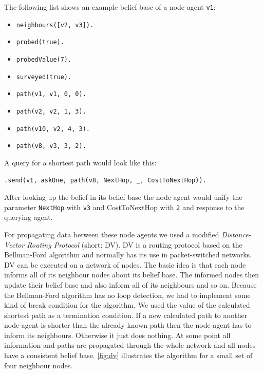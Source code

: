 \begin{samepage}
The following list shows an example belief base of a node agent \texttt{v1}:
\begin{itemize}
  \item \texttt{neighbours([v2, v3]).}
  \item \texttt{probed(true).}
  \item \texttt{probedValue(7).}
  \item \texttt{surveyed(true).}
  \item \texttt{path(v1, v1, 0, 0).}
  \item \texttt{path(v2, v2, 1, 3).}
  \item \texttt{path(v10, v2, 4, 3).}
  \item \texttt{path(v8, v3, 3, 2).}
\end{itemize}
\end{samepage}

A query for a shortest path would look like this:
\begin{lstlisting}[caption={Query for shortest path from \texttt{v1} to \texttt{v8}}, label={lst:dv_shortestPath_query}]
  .send(v1, askOne, path(v8, NextHop, _, CostToNextHop)).
\end{lstlisting}
After looking up the belief in its belief base the node agent would unify the parameter \texttt{NextHop} with \texttt{v3} and CostToNextHop with \texttt{2} and response to the querying agent.

For propagating data between these node agents we used a modified \emph{Distance-Vector Routing Protocol} (short: DV).
DV is a routing protocol based on the Bellman-Ford algorithm and normally has its use in packet-switched networks.
DV can be executed on a network of nodes.
The basic idea is that each node informs all of its neighbour nodes about its belief base.
The informed nodes then update their belief base and also inform all of its neighbours and so on.
Because the Bellman-Ford algorithm has no loop detection, we had to implement some kind of break condition for the algorithm.
We used the value of the calculated shortest path as a termination condition.
If a new calculated path to another node agent is shorter than the already known path then the node agent has to inform its neighbours.
Otherwise it just does nothing.
At some point all information and paths are propagated through the whole network and all nodes have a consistent belief base.
\autoref{fig:dv} illustrates the algorithm for a small set of four neighbour nodes.

